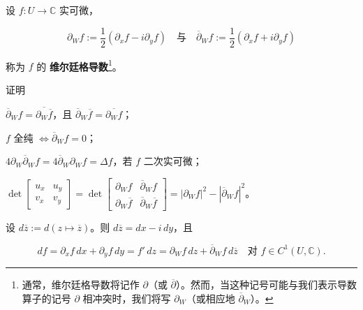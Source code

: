 \begin{exercises}
\item

设 $ f : U \to \mathbb{C} $ 实可微，

\[
\partial_W f := \frac{1}{2}(\partial_x f - i\partial_y f) \quad \text{与} \quad \overline{\partial}_W f := \frac{1}{2}(\partial_x f + i\partial_y f)
\]

称为 $ f $ 的 \textbf{维尔廷格导数}\footnote{通常，维尔廷格导数将记作 $ \partial $（或 $ \overline{\partial} $）。然而，当这种记号可能与我们表示导数算子的记号 $ \partial $ 相冲突时，我们将写 $ \partial_W $（或相应地 $ \overline{\partial}_W $）。}。

证明

\begin{items}
\item

$ \overline{\partial}_W f = \overline{\partial_W \overline{f}} $，且 $ \overline{\partial}_W \overline{f} = \overline{\partial_W f} $；

\item

$ f $ 全纯 $ \iff \overline{\partial}_W f = 0 $；

\item

$ 4\partial_W \overline{\partial}_W f = 4\overline{\partial}_W \partial_W f = \Delta f $，若 $ f $ 二次实可微；

\item

$ \det\begin{bmatrix} u_x & u_y \\ v_x & v_y \end{bmatrix} = \det\begin{bmatrix} \partial_W f & \overline{\partial}_W f \\ \partial_W \overline{f} & \overline{\partial}_W \overline{f} \end{bmatrix} = \left|\partial_W f\right|^2 - \left|\overline{\partial}_W f\right|^2 $。

\end{items}

\item

设 $ d\overline{z} := d(z \mapsto \overline{z}) $。则 $ d\overline{z} = dx - i\,dy $，且

\[
df = \partial_x f\,dx + \partial_y f\,dy = f'\,dz = \partial_W f\,dz + \overline{\partial}_W f\,d\overline{z} \quad \text{对 } f \in C^1(U,\mathbb{C}) .
\]
\item


\end{exercises}
